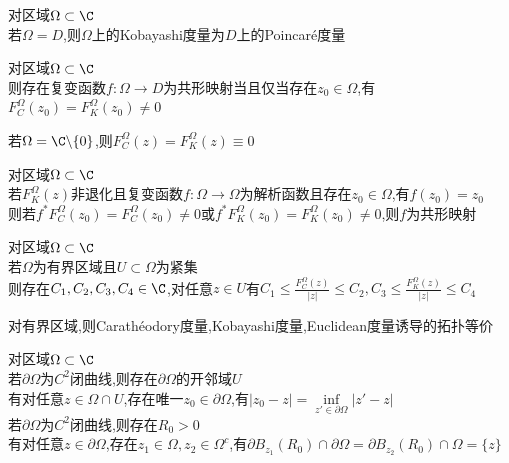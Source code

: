 \begin{dingli}
对区域$\Omega\subset\C$\\
若$\Omega=D$,则$\Omega$上的Kobayashi度量为$D$上的Poincaré度量
\end{dingli}

\begin{dingli}
对区域$\Omega\subset\C$\\
则存在复变函数$f:\Omega\to D$为共形映射当且仅当存在$z_0\in\Omega$,有$F_{C}^{\Omega}(z_0)=F_{K}^{\Omega}(z_0)\neq 0$
\end{dingli}

\begin{zhu}
若$\Omega=\C\backslash\{0\}$,则$F_{C}^{\Omega}(z)=F_{K}^{\Omega}(z)\equiv 0$
\end{zhu}

\begin{dingli}
对区域$\Omega\subset\C$\\
若$F_{K}^{\Omega}(z)$非退化且复变函数$f:\Omega\to\Omega$为解析函数且存在$z_0\in\Omega$,有$f(z_0)=z_0$\\
则若$f^*F_{C}^{\Omega}(z_0)=F_{C}^{\Omega}(z_0)\neq0$或$f^*F_{K}^{\Omega}(z_0)=F_{K}^{\Omega}(z_0)\neq 0$,则$f$为共形映射
\end{dingli}

\begin{dingli}
对区域$\Omega\subset\C$\\
若$\Omega$为有界区域且$U\subset\Omega$为紧集\\
则存在$C_1,C_2,C_3,C_4\in\C$,对任意$z\in U$有$C_1\leq\frac{F_{C}^{\Omega}(z)}{|z|}\leq C_2, C_3\leq\frac{F_{K}^{\Omega}(z)}{|z|}\leq C_4$
\end{dingli}

\begin{zhu}
对有界区域,则Carathéodory度量,Kobayashi度量,Euclidean度量诱导的拓扑等价
\end{zhu}

\begin{dingli}
对区域$\Omega\subset\C$\\
若$\partial\Omega$为$C^2$闭曲线,则存在$\partial\Omega$的开邻域$U$\\
有对任意$z\in\Omega\cap U$,存在唯一$z_0\in\partial\Omega$,有$|z_0-z|=\inf\limits_{z'\in\partial\Omega}|z'-z|$\\
若$\partial\Omega$为$C^2$闭曲线,则存在$R_0>0$\\
有对任意$z\in\partial\Omega$,存在$z_1\in\Omega,z_2\in\Omega^{c}$,有$\partial B_{z_1}(R_0)\cap\partial\Omega=\partial B_{z_2}(R_0)\cap\Omega=\{z\}$
\end{dingli}

